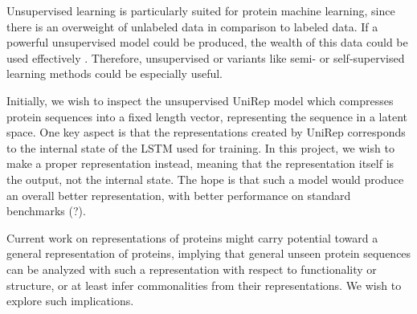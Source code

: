 \documentclass[a4paper,11pt]{report}
\begin{document}
Unsupervised learning is particularly suited for protein machine learning, since there is an overweight of unlabeled data in comparison to labeled data. If a powerful unsupervised model could be produced, the wealth of this data could be used effectively \cite{AlQuraishiUnsupervised}. Therefore, unsupervised or variants like semi- or self-supervised learning methods could be especially useful.

Initially, we wish to inspect the unsupervised UniRep model \cite{alley2019unified} which compresses protein sequences into a fixed length vector, representing the sequence in a latent space. One key aspect is that the representations created by UniRep corresponds to the internal state of the LSTM used for training. In this project, we wish to make a proper representation instead, meaning that the representation itself is the output, not the internal state. The hope is that such a model would produce an overall better representation, with better performance on standard benchmarks (?).

Current work on representations of proteins might carry potential toward a general representation of proteins, implying that general unseen protein sequences can be analyzed with such a representation with respect to functionality or structure, or at least infer commonalities from their representations. We wish to explore such implications.






\end{document}

